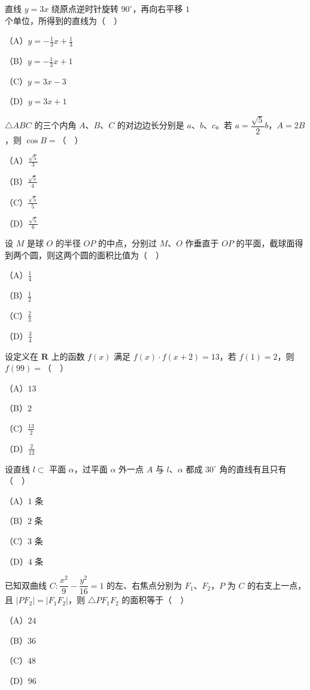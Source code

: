 \begin{question}
直线 $y=3x$ 绕原点逆时针旋转 $90^\circ$，再向右平移 $1$ 个单位，所得到的直线为（　）

（A）$y=-\frac13x+\frac13$

（B）$y=-\frac13x+1$

（C）$y=3x-3$

（D）$y=3x+1$

\end{question}
\begin{question}
$\triangle ABC$ 的三个内角 $A$、$B$、$C$ 的对边边长分别是 $a$、$b$、$c$。若 $a=\dfrac{\sqrt5}2b$，$A=2B$，则 $\cos B=$（　）

（A）$\frac{\sqrt5}3$

（B）$\frac{\sqrt5}4$

（C）$\frac{\sqrt5}5$

（D）$\frac{\sqrt5}6$

\end{question}
\begin{question}
设 $M$ 是球 $O$ 的半径 $OP$ 的中点，分别过 $M$、$O$ 作垂直于 $OP$ 的平面，截球面得到两个圆，则这两个圆的面积比值为（　）

（A）$\frac14$

（B）$\frac12$

（C）$\frac23$

（D）$\frac34$

\end{question}
\begin{question}
设定义在 $\mathbf R$ 上的函数 $f(x)$ 满足 $f(x)\cdot f(x+2)=13$，若 $f(1)=2$，则 $f(99)=$（　）

（A）$13$

（B）$2$

（C）$\frac{13}2$

（D）$\frac2{13}$

\end{question}
\begin{question}
设直线 $l\subset$ 平面 $\alpha$，过平面 $\alpha$ 外一点 $A$ 与 $l$、$\alpha$ 都成 $30^\circ$ 角的直线有且只有（　）

（A）$1$ 条

（B）$2$ 条

（C）$3$ 条

（D）$4$ 条

\end{question}
\begin{question}
已知双曲线 $C:\dfrac{x^2}9-\dfrac{y^2}{16}=1$ 的左、右焦点分别为 $F_1$、$F_2$，$P$ 为 $C$ 的右支上一点，且 $|PF_2|=|F_1F_2|$，则 $\triangle PF_1F_2$ 的面积等于（　）

（A）$24$

（B）$36$

（C）$48$

（D）$96$

\end{question}
